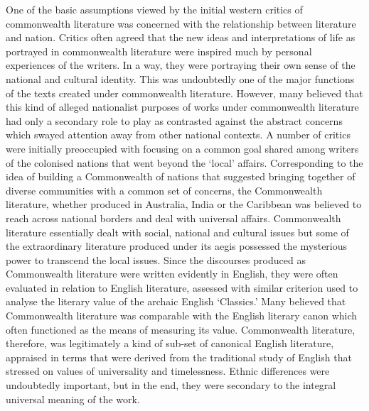 One of the basic assumptions viewed by the initial western critics of commonwealth literature was concerned with the relationship between literature and nation. Critics often agreed that the new ideas and interpretations of life as portrayed in commonwealth literature were inspired much by personal experiences of the writers. In a way, they were portraying their own sense of the national and cultural identity. This was undoubtedly one of the major functions of the texts created under commonwealth literature. However, many believed that this kind of alleged nationalist purposes of works under commonwealth literature had only a secondary role to play as contrasted against the abstract concerns which swayed attention away from other national contexts. A number of critics were initially preoccupied with focusing on a common goal shared among writers of the colonised nations that went beyond the ‘local’ affairs. Corresponding to the idea of building a Commonwealth of nations that suggested bringing together of diverse communities with a common set of concerns, the Commonwealth literature, whether produced in Australia, India or the Caribbean was believed to reach across national borders and deal with universal affairs. Commonwealth literature essentially dealt with social, national and cultural issues but some of the extraordinary literature produced under its aegis possessed the mysterious power to transcend the local issues. Since the discourses produced as Commonwealth literature were written evidently in English, they were often evaluated in relation to English literature, assessed with similar criterion used to analyse the literary value of the archaic English ‘Classics.’ Many believed that Commonwealth literature was comparable with the English literary canon which often functioned as the means of measuring its value. Commonwealth literature, therefore, was legitimately a kind of sub-set of canonical English literature, appraised in terms that were derived from the traditional study of English that stressed on values of universality and timelessness. Ethnic differences were undoubtedly important, but in the end, they were secondary to the integral universal meaning of the work. 

